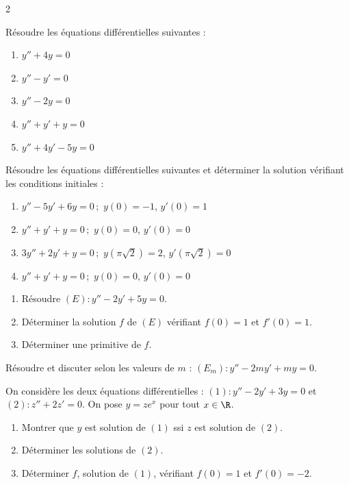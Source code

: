 \begin{multicols*}{2}

\begin{Exercice}
R\'esoudre les \'equations diff\'erentielles suivantes :
\begin{enumerate}[label=\alph*)]
  \item $y''+4y=0$
  \item $y''-y'=0$
  \item $y''-2y=0$
  \item $y''+y'+y=0$
  \item $y''+4y'-5y=0$
\end{enumerate}
\end{Exercice}

\begin{Exercice}
R\'esoudre les \'equations diff\'erentielles suivantes et d\'eterminer la solution v\'erifiant les conditions initiales :
\begin{enumerate}[label=\alph*)]
  \item $y''-5y'+6y=0$\,;\, $y(0)=-1$, $y'(0)=1$
  \item $y''+y'+y=0$\,;\, $y(0)=0$, $y'(0)=0$
  \item $3y''+2y'+y=0$\,;\, $y(\pi\sqrt{2})=2$, $y'(\pi\sqrt{2})=0$
  \item $y''+y'+y=0$\,;\, $y(0)=0$, $y'(0)=0$
\end{enumerate}
\end{Exercice}

\begin{Exercice}
\begin{enumerate}
  \item R\'esoudre $(E):y''-2y'+5y=0$.
  \item D\'eterminer la solution $f$ de $(E)$ v\'erifiant $f(0)=1$ et $f'(0)=1$.
  \item D\'eterminer une primitive de $f$.
\end{enumerate}
\end{Exercice}

\begin{Exercice}
R\'esoudre et discuter selon les valeurs de $m$ :
$(E_m):y''-2my'+my=0$.
\end{Exercice}

\begin{Exercice}
On consid\`ere les deux \'equations diff\'erentielles :
$(1):y''-2y'+3y=0$ \quad et \quad $(2):z''+2z'=0$.
On pose $y=ze^x$ pour tout $x\in\R$.
\begin{enumerate}
  \item Montrer que $y$ est solution de $(1)$ ssi $z$ est solution de $(2)$.
  \item D\'eterminer les solutions de $(2)$.
  \item D\'eterminer $f$, solution de $(1)$, v\'erifiant $f(0)=1$ et $f'(0)=-2$.
\end{enumerate}
\end{Exercice}


\end{multicols*}
